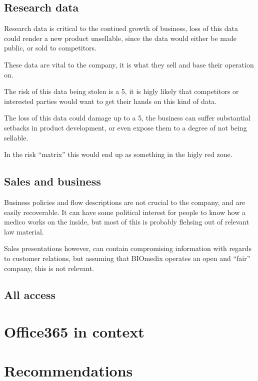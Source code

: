 \documentclass[paper=a4, fontsize=11pt]{scrartcl} %
\numberwithin{equation}{section} %
\numberwithin{figure}{section} %
\numberwithin{table}{section} %
\begin{document}
\subsection{Research data}
Research data is critical to the contiued growth of business, loss of this data
could render a new product unsellable, since the data would either be made
public, or sold to competitors.

These data are vital to the company, it is what they sell and base their
operation on.

The risk of this data being stolen is a 5, it is higly likely that competitors
or interested parties would want to get their hands on this kind of data.

The loss of this data could damage up to a 5, the business can suffer
substantial setbacks in product development, or even expose them to a degree of
not being sellable.

In the risk ``matrix'' this would end up as something in the higly red zone.

\subsection{Sales and business}
Business policies and flow descriptions are not crucial to the company, and
are easily recoverable. It can have some political interest for people to
know how a medico works on the inside, but most of this is probably flehsing
out of relevant law material.

Sales presentations however, can contain compromising information with regards
to customer relations, but assuming that BIOmedix operates an open and ``fair''
company, this is not relevant.

\subsection{All access}

\section{Office365 in context}


\section{Recommendations}
\end{document}
